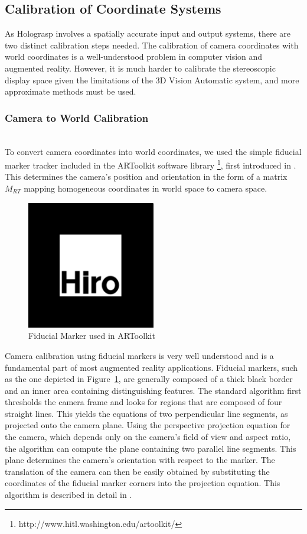 \documentclass[pageno]{jpaper}
\begin{document}
\subsection{Calibration of Coordinate Systems}
As Holograsp involves a spatially accurate input and output systems, there are two distinct calibration steps needed. The calibration
of camera coordinates with world coordinates is a well-understood problem in computer vision and augmented reality.
However, it is much harder to calibrate the stereoscopic display space given the limitations of the 3D Vision Automatic
system, and more approximate methods must be used.
\subsubsection{Camera to World Calibration}$ $\\
To convert camera coordinates into world coordinates, we used the simple fiducial marker tracker included in the ARToolkit software
library \footnote{http://www.hitl.washington.edu/artoolkit/}, first introduced in \cite{artoolkit}. This determines the camera's position
and orientation in the form of a matrix $M_{RT}$ mapping homogeneous coordinates in world space to camera space.

\begin{figure}
\centering
\includegraphics[width=0.5\textwidth]{figures/hiro.png}
\caption{Fiducial Marker used in ARToolkit}
\label{fig:hiro}
\end{figure}

Camera calibration using fiducial markers is very well understood and is a fundamental part of most augmented reality applications. Fiducial
markers, such as the one depicted in Figure~\ref{fig:hiro}, are generally composed of a thick black border and an inner area
containing distinguishing features. The standard algorithm first thresholds the camera frame and looks for regions that are composed of four straight lines.
This yields the equations of two perpendicular line segments, as projected onto the camera plane. Using the perspective projection equation
for the camera, which depends only on the camera's field of view and aspect ratio, the algorithm can compute the plane containing two
parallel line segments. This plane determines the camera's orientation with respect to the marker. The translation of the camera can then be
easily obtained by substituting the coordinates of the fiducial marker corners into the projection equation. This algorithm is described in
detail in \cite{kato1999marker}.
\end{document}
